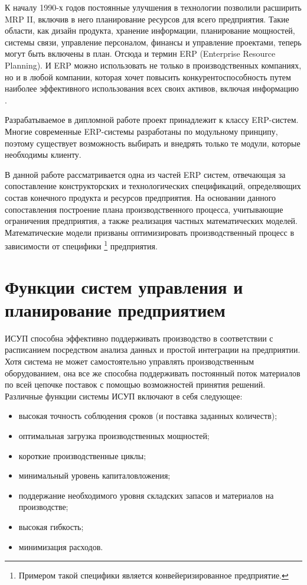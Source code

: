 К началу 1990-х годов постоянные улучшения в технологии позволили расширить MRP II, включив в него планирование ресурсов для всего предприятия. Такие области, как дизайн продукта, хранение информации, планирование мощностей, системы связи, управление персоналом, финансы и управление проектами, теперь могут быть включены в план. Отсюда и термин ERP (Enterprise Resource Planning). И ERP можно использовать не только в производственных компаниях, но и в любой компании, которая хочет повысить конкурентоспособность путем наиболее эффективного использования всех своих активов, включая информацию \cite{ptak_schragenheim_2004}.

Разрабатываемое в дипломной работе проект принадлежит к классу ERP-систем. Многие современные ERP-системы разработаны по модульному принципу, поэтому существует возможность выбирать и внедрять только те модули, которые необходимы клиенту.

В данной работе рассматривается одна из частей ERP систем, отвечающая за сопоставление конструкторских и технологических спецификаций, определяющих состав конечного продукта и ресурсов предприятия. На основании данного сопоставления построение плана производственного процесса, учитывающие ограничения предприятия, а также реализация частных математических моделей. Математические модели призваны оптимизировать производственный процесс в зависимости от специфики \footnote{Примером такой специфики является конвейеризированное предприятие.} предприятия.

\section{Функции систем управления и планирование предприятием}

ИСУП способна эффективно поддерживать производство в соответствии с расписанием посредством анализа данных и простой интеграции на предприятии. Хотя система не может самостоятельно управлять производственным оборудованием, она все же способна поддерживать постоянный поток материалов по всей цепочке поставок с помощью возможностей принятия решений. Различные функции системы ИСУП включают в себя следующее:

\begin{itemize}
    \item высокая точность соблюдения сроков (и поставка заданных количеств);
    \item оптимальная загрузка производственных мощностей;
    \item короткие производственные циклы;
    \item минимальный уровень капиталовложения;
    \item поддержание необходимого уровня складских запасов и материалов на производстве;
    \item высокая гибкость;
    \item минимизация расходов.
\end{itemize}

